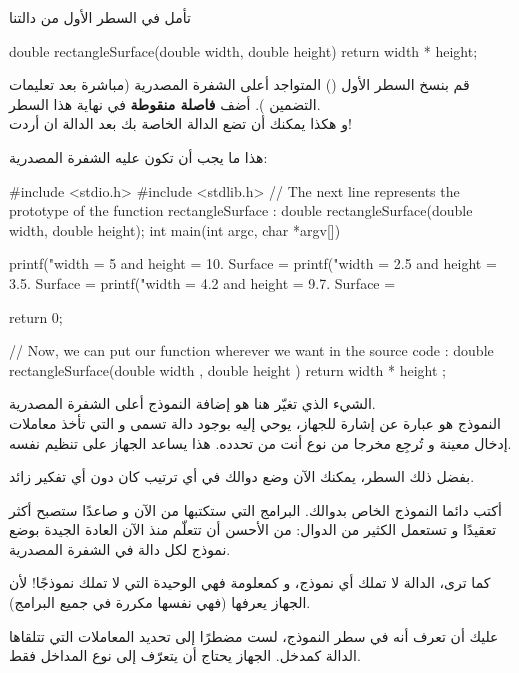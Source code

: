 تأمل في السطر الأول من دالتنا

\begin{Csource}
double rectangleSurface(double width, double height)
{
	return width * height;
}
\end{Csource}

قم بنسخ السطر الأول
()
المتواجد أعلى الشفرة المصدرية (مباشرة بعد تعليمات التضمين
). أضف
\textbf{فاصلة منقوطة}
في نهاية هذا السطر.\\
و هكذا يمكنك أن تضع الدالة الخاصة بك
بعد الدالة
ان أردت!

هذا ما يجب أن تكون عليه الشفرة المصدرية:

\begin{Csource}
#include <stdio.h>
#include <stdlib.h>
// The next line represents the prototype of the function rectangleSurface :
double rectangleSurface(double width, double height);
int main(int argc, char *argv[])
{
	printf("width = 5 and height = 10. Surface = %
	printf("width = 2.5 and height = 3.5. Surface = %
	printf("width = 4.2 and height = 9.7. Surface = %

	return 0;
}
// Now, we can put our function wherever we want in the source code :
double rectangleSurface(double width , double height )
{
	return width * height ;
}
\end{Csource}

الشيء الذي تغيّر هنا هو إضافة النموذج أعلى الشفرة المصدرية.\\
النموذج هو عبارة عن إشارة للجهاز، يوحي إليه بوجود دالة تسمى
و التي تأخذ معاملات إدخال معينة و تُرجِع مخرجا من نوع أنت من تحدده.  هذا يساعد الجهاز على تنظيم نفسه.

بفضل ذلك السطر، يمكنك الآن وضع دوالك في أي ترتيب كان دون أي تفكير زائد.

أكتب دائما النموذج الخاص بدوالك. البرامج التي ستكتبها من الآن و صاعدًا ستصبح أكثر تعقيدًا و تستعمل الكثير من الدوال: من الأحسن أن تتعلّم منذ الآن العادة الجيدة  بوضع نموذج لكل دالة في الشفرة المصدرية.

كما ترى، الدالة
لا تملك أي نموذج، و كمعلومة فهي الوحيدة التي لا تملك نموذجًا! لأن الجهاز يعرفها (فهي نفسها مكررة في جميع البرامج).

عليك أن تعرف أنه في سطر النموذج، لست مضطرًا إلى تحديد المعاملات التي تتلقاها الدالة كمدخل. الجهاز يحتاج أن يتعرّف إلى نوع المداخل فقط.

